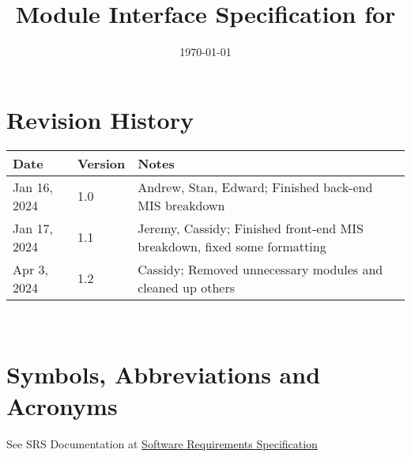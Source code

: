 \documentclass[12pt, titlepage]{article}
\begin{document}
\title{Module Interface Specification for \progname{}}

\author{\authname}

\date{\today}

\maketitle


\section{Revision History}

\begin{tabularx}{\textwidth}{p{3cm}p{2cm}X}
\toprule {\bf Date} & {\bf Version} & {\bf Notes}\\
\midrule
Jan 16, 2024 & 1.0 & Andrew, Stan, Edward; Finished back-end MIS breakdown\\
Jan 17, 2024 & 1.1 & Jeremy, Cassidy; Finished front-end MIS breakdown, fixed some formatting \\
Apr 3, 2024 & 1.2 & Cassidy; Removed unnecessary modules and cleaned up others \\
\bottomrule
\end{tabularx}

~\newpage

\section{Symbols, Abbreviations and Acronyms}

See SRS Documentation at \href{https://github.com/stanreee/sign-language-learning/blob/main/docs/SRS/SRS.pdf}{Software Requirements Specification} \\
\end{document}
